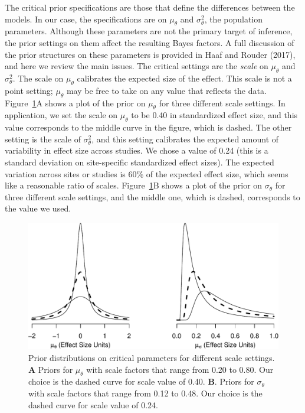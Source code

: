 \documentclass[english,man]{apa6}
\theoremstyle{definition}
\theoremstyle{definition}
\theoremstyle{definition}
\theoremstyle{remark}
\begin{document}
The critical prior specifications are those that define the differences
between the models. In our case, the specifications are on
\(\mu_\theta\) and \(\sigma^2_\theta\), the population parameters.
Although these parameters are not the primary target of inference, the
prior settings on them affect the resulting Bayes factors. A full
discussion of the prior structures on these parameters is provided in
Haaf and Rouder (2017), and here we review the main issues. The critical
settings are the \emph{scale} on \(\mu_\theta\) and \(\sigma^2_\theta\).
The scale on \(\mu_\theta\) calibrates the expected size of the effect.
This scale is not a point setting; \(\mu_\theta\) may be free to take on
any value that reflects the data. Figure~\ref{fig:prior}A shows a plot
of the prior on \(\mu_\theta\) for three different scale settings. In
application, we set the scale on \(\mu_\theta\) to be 0.40 in
standardized effect size, and this value corresponds to the middle curve
in the figure, which is dashed. The other setting is the scale of
\(\sigma^2_\theta\), and this setting calibrates the expected amount of
variability in effect size across studies. We chose a value of 0.24
(this is a standard deviation on site-specific standardized effect
sizes). The expected variation across sites or studies is 60\% of the
expected effect size, which seems like a reasonable ratio of scales.
Figure~\ref{fig:prior}B shows a plot of the prior on \(\sigma_\theta\)
for three different scale settings, and the middle one, which is dashed,
corresponds to the value we used.








\begin{figure}[htbp]
\centering
\includegraphics{p_files/figure-latex/prior-1.pdf}
\caption{\label{fig:prior}Prior distributions on critical parameters for different scale
settings. \textbf{A} Priors for \(\mu_\theta\) with scale factors that
range from 0.20 to 0.80. Our choice is the dashed curve for scale value
of 0.40. \textbf{B}. Priors for \(\sigma_\theta\) with scale factors
that range from 0.12 to 0.48. Our choice is the dashed curve for scale
value of 0.24.}
\end{figure}
\end{document}

